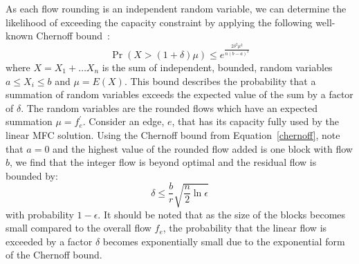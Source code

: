 As each flow rounding is an independent random variable, we can determine the likelihood of exceeding the capacity constraint by applying the following well-known Chernoff bound~\cite{chernoff1952}:
\begin{equation}
  \label{chernoff}
  \Pr(X > (1+\delta)\mu) \leq e^{\frac{2\delta^2\mu^2}{n(b-a)^2}}
\end{equation}
where $X=X_1 + \ldots X_n$ is the sum of independent, bounded, random variables $a \leq X_i \leq b$ and $\mu = E{(X)} $. This bound describes the probability that a summation of random variables exceeds the expected value of the sum by a factor of $\delta$. The random variables are the rounded flows which have an expected summation $\mu = f^\prime_e$. Consider an edge, $e$, that has its capacity fully used by the linear MFC solution. Using the Chernoff bound from Equation~\ref{chernoff}, note that $a=0$ and the highest value of the rounded flow added is one block with flow $b$, we find that the integer flow is beyond optimal and the residual flow is bounded by:
\begin{equation}
  \label{block}
  \delta \leq \frac{b}{r} \sqrt{\frac{n}{2}\ln\epsilon}
\end{equation}
with probability $1-\epsilon$. It should be noted that as the size of the blocks becomes small compared to the overall flow $f_e$, the probability that the linear flow is exceeded by a factor $\delta$ becomes exponentially small due to the exponential form of the Chernoff bound.
